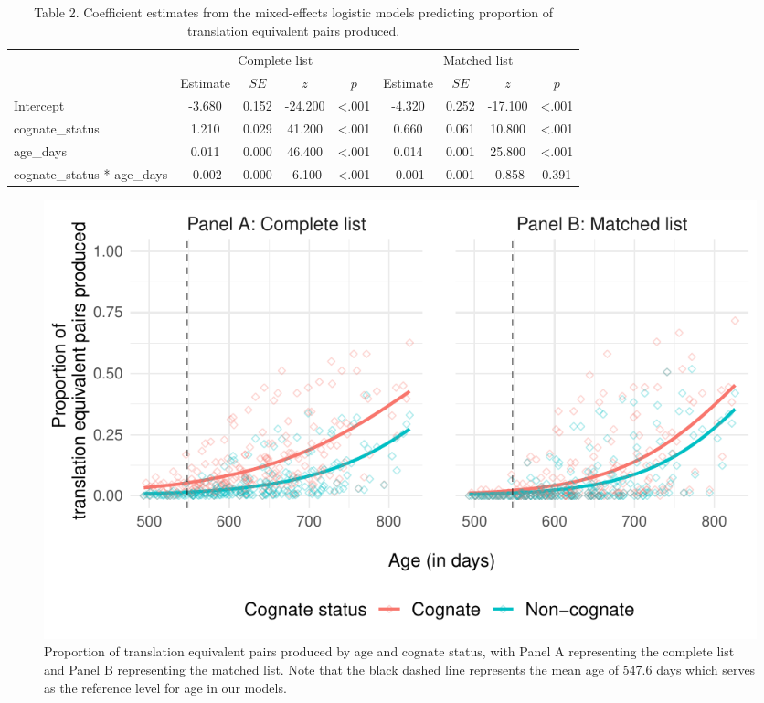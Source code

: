 \documentclass[
  ,man,floatsintext]{apa6}
\begin{document}
\begin{table}[H]

\begin{center}
\begin{threeparttable}

\caption{\label{tab:Table 2}Table 2. Coefficient estimates from the mixed-effects logistic models predicting proportion of translation equivalent pairs produced.}

\begin{tabular}{lcccccccc}
\toprule
 & \multicolumn{4}{c}{Complete list} & \multicolumn{4}{c}{Matched list} \\
\cmidrule(r){2-5} \cmidrule(r){6-9}
 & Estimate & $SE$ & $z$ & $p$ & Estimate & $SE$ & $z$ & $p$\\
\midrule
Intercept & -3.680 & 0.152 & -24.200 & <.001 & -4.320 & 0.252 & -17.100 & <.001\\
cognate\_status & 1.210 & 0.029 & 41.200 & <.001 & 0.660 & 0.061 & 10.800 & <.001\\
age\_days & 0.011 & 0.000 & 46.400 & <.001 & 0.014 & 0.001 & 25.800 & <.001\\
cognate\_status * age\_days & -0.002 & 0.000 & -6.100 & <.001 & -0.001 & 0.001 & -0.858 & 0.391\\
\bottomrule
\end{tabular}

\end{threeparttable}
\end{center}

\end{table}

\begin{figure}

{\centering \includegraphics[width=1.2\linewidth]{CogVocab_paper_files/figure-latex/Fig2-1} 

}

\caption{Proportion of translation equivalent pairs produced by age and cognate status, with Panel A representing the complete list and Panel B representing the matched list. Note that the black dashed line represents the mean age of 547.6 days which serves as the reference level for age in our models.}\label{fig:Fig2}
\end{figure}
\end{document}
